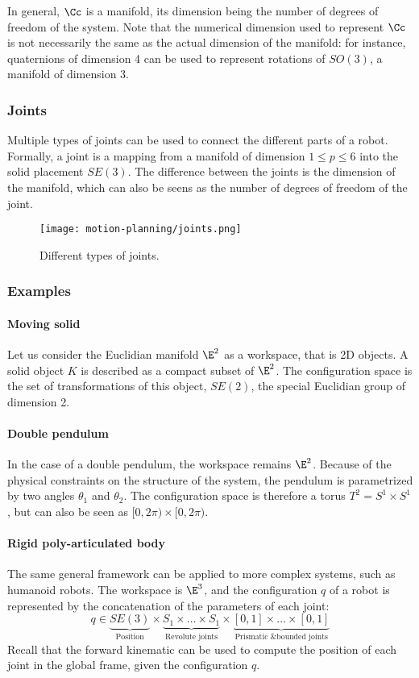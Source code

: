 In general, $\Cc$ is a manifold, its dimension being the number of degrees of freedom of the system. Note that the numerical dimension used to represent $\Cc$ is not necessarily the same as the actual dimension of the manifold: for instance, quaternions of dimension 4 can be used to represent rotations of $SO(3)$, a manifold of dimension 3.

\subsubsection{Joints}
Multiple types of joints can be used to connect the different parts of a robot. Formally, a joint is a mapping from a manifold of dimension $1\leq p\leq6$ into the solid placement $SE(3)$. The difference between the joints is the dimension of the manifold, which can also be seens as the number of degrees of freedom of the joint.
\begin{figure}
    \centering
    \texttt{[image: motion-planning/joints.png]}
    \caption{Different types of joints.}
\end{figure}

\subsubsection{Examples}
\paragraph*{Moving solid}
Let us consider the Euclidian manifold $\E^2$ as a workspace, that is 2D objects. A solid object $K$ is described as a compact subset of $\E^2$. The configuration space is the set of transformations of this object, $SE(2)$, the special Euclidian group of dimension 2.

\paragraph*{Double pendulum}
In the case of a double pendulum, the workspace remains $\E^2$. Because of the physical constraints on the structure of the system, the pendulum is parametrized by two angles $\theta_1$ and $\theta_2$. The configuration space is therefore a torus $T^2=S^1\times S^1$, but can also be seen as $[0,2\pi)\times[0,2\pi)$.

\paragraph*{Rigid poly-articulated body}
The same general framework can be applied to more complex systems, such as humanoid robots. The workspace is $\E^3$, and the configuration $q$ of a robot is represented by the concatenation of the parameters of each joint:
\begin{equation*}
    q\in \underbrace{SE(3)}_{\text{Position}} \times \underbrace{S_1\times \dots\times S_1}_{\text{Revolute joints}} \times \underbrace{[0,1]\times\dots\times[0,1]}_{\text{Prismatic \& bounded joints}}
\end{equation*}
Recall that the forward kinematic can be used to compute the position of each joint in the global frame, given the configuration $q$.

